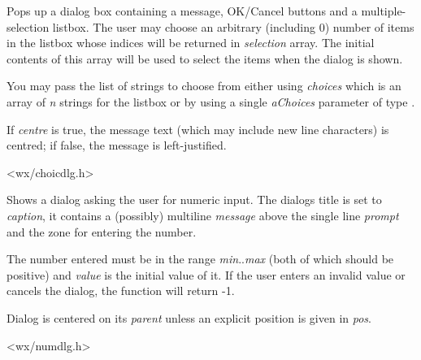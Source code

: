 Pops up a dialog box containing a message, OK/Cancel buttons and a
multiple-selection listbox. The user may choose an arbitrary (including 0)
number of items in the listbox whose indices will be returned in
{\it selection} array. The initial contents of this array will be used to
select the items when the dialog is shown.

You may pass the list of strings to choose from either using {\it choices}
which is an array of {\it n} strings for the listbox or by using a single
{\it aChoices} parameter of type .

If {\it centre} is true, the message text (which may include new line
characters) is centred; if false, the message is left-justified.


<wx/choicdlg.h>



\label{wxgetnumberfromuser}


Shows a dialog asking the user for numeric input. The dialogs title is set to
{\it caption}, it contains a (possibly) multiline {\it message} above the
single line {\it prompt} and the zone for entering the number.

The number entered must be in the range {\it min}..{\it max} (both of which
should be positive) and {\it value} is the initial value of it. If the user
enters an invalid value or cancels the dialog, the function will return -1.

Dialog is centered on its {\it parent} unless an explicit position is given in
{\it pos}.


<wx/numdlg.h>


\label{wxgetpasswordfromuser}


